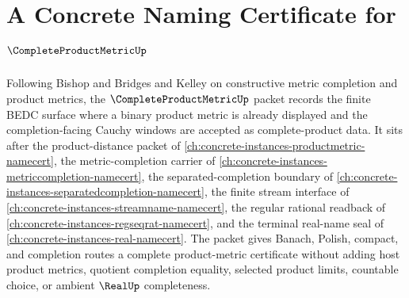 \chapter{A Concrete Naming Certificate for $\CompleteProductMetricUp$}
\label{ch:concrete-instances-complete-product-metric-namecert}

Following Bishop and Bridges and Kelley on constructive metric completion and product metrics, the $\CompleteProductMetricUp$ packet records the finite BEDC surface where a binary product metric is already displayed and the completion-facing Cauchy windows are accepted as complete-product data. It sits after the product-distance packet of \autoref{ch:concrete-instances-productmetric-namecert}, the metric-completion carrier of \autoref{ch:concrete-instances-metriccompletion-namecert}, the separated-completion boundary of \autoref{ch:concrete-instances-separatedcompletion-namecert}, the finite stream interface of \autoref{ch:concrete-instances-streamname-namecert}, the regular rational readback of \autoref{ch:concrete-instances-regseqrat-namecert}, and the terminal real-name seal of \autoref{ch:concrete-instances-real-namecert}. The packet gives Banach, Polish, compact, and completion routes a complete product-metric certificate without adding host product metrics, quotient completion equality, selected product limits, countable choice, or ambient $\RealUp$ completeness.

